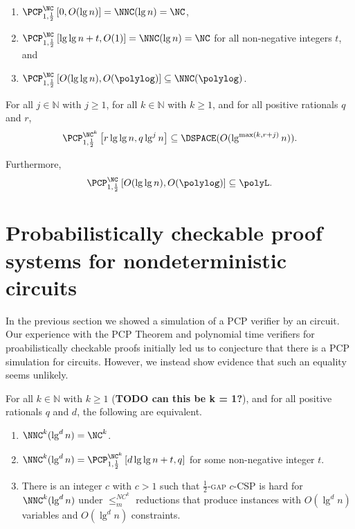\documentclass[]{article}
\newcommand{\PCPcs}[5]{\PCP^{#1}_{#2, #3}\left[#4, #5\right]}
\begin{document}
\begin{corollary}\label{cor:pcpinnnc}
  \mbox{}
  \begin{enumerate}
  \item $\PCPcs{\NC}{1}{\frac{1}{2}}{0}{O(\lg n)} = \NNC(\lg n) = \NC$,
  \item $\PCPcs{\NC}{1}{\frac{1}{2}}{\lg \lg n + t}{O(1)} = \NNC(\lg n) = \NC$ for all non-negative integers $t$, and
  \item $\PCPcs{\NC}{1}{\frac{1}{2}}{O(\lg \lg n)}{O(\polylog)} \subseteq \NNC(\polylog)$.
  \end{enumerate}
\end{corollary}

\begin{corollary}\label{cor:pcpinnnck}
  For all $j \in \mathbb{N}$ with $j \geq 1$, for all $k \in \mathbb{N}$ with $k \geq 1$, and for all positive rationals $q$ and $r$,
  \begin{equation*}
    \PCPcs{\NC^k}{1}{\frac{1}{2}}{r \lg \lg n}{q \lg^j n} \subseteq \DSPACE(O(\lg^{\max(k, r + j)} n)).
  \end{equation*}

  Furthermore,
  \begin{equation*}
    \PCPcs{\NC}{1}{\frac{1}{2}}{O(\lg \lg n)}{O(\polylog)} \subseteq \polyL.
  \end{equation*}
\end{corollary}

\section{Probabilistically checkable proof systems for nondeterministic \texorpdfstring{\NC}{NC} circuits}\label{sec:pcpinnnc}

In the previous section we showed a simulation of a PCP verifier by an \NNC{} circuit.
Our experience with the PCP Theorem and polynomial time verifiers for proabilistically checkable proofs initially led us to conjecture that there is a PCP simulation for \NNC{} circuits.
However, we instead show evidence that such an equality seems unlikely.

\begin{theorem}\label{thm:equiv}
  For all $k \in \mathbb{N}$ with $k \geq 1$ (\textbf{TODO can this be k = 1?}), and for all positive rationals $q$ and $d$, the following are equivalent.
  \begin{enumerate}
  \item $\NNC^k(\lg^d n) = \NC^k$.
  \item $\NNC^k(\lg^d n) = \PCPcs{\NC^k}{1}{\frac{1}{2}}{d \lg \lg n + t}{q}$ for some non-negative integer $t$.
  \item There is an integer $c$ with $c > 1$ such that \textsc{$\frac{1}{2}$-gap $c$-CSP} is hard for $\NNC^k(\lg^d n)$ under $\leq_m^{NC^k}$ reductions that produce instances with $O(\lg^d n)$ variables and $O(\lg^d n)$ constraints.
  \end{enumerate}
\end{theorem}
\end{document}
